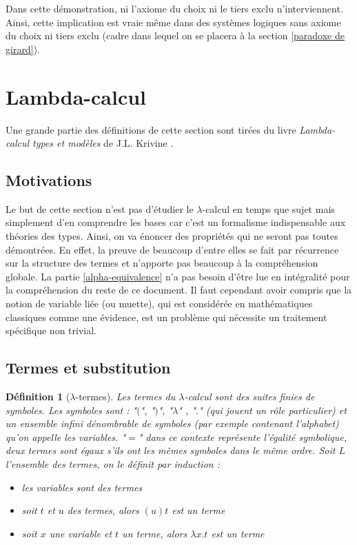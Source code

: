 \documentclass[a4paper,12pt]{article}
\theoremstyle{plain}
\newtheorem{defi}[theo]{Définition}
\begin{document}
Dans cette démonstration, ni l'axiome du choix ni le tiers exclu
n'interviennent. Ainsi, cette implication est vraie même dans des
systèmes logiques sans axiome du choix ni tiers exclu (cadre dans lequel
on se placera à la section \ref{paradoxe de girard}).

\clearpage

\section{Lambda-calcul}
\label{lambda-calcul}

Une grande partie des définitions de cette section sont tirées du livre \textit{Lambda-calcul types et modèles} de J.L. Krivine \cite{Lambda-calc}.

\subsection{Motivations}

Le but de cette section n'est pas d'étudier le $\lambda$-calcul en temps que sujet mais simplement d'en comprendre les bases car c'est un formalisme indispensable aux théories des types. Ainsi, on va énoncer des propriétés qui ne seront pas toutes démontrées. En effet, la preuve de beaucoup d'entre elles se fait par récurrence sur la structure des termes et n'apporte pas beaucoup à la compréhension globale. La partie \ref{alpha-equivalence} n'a pas besoin d'être lue en intégralité pour la compréhension du reste de ce document. Il faut cependant avoir compris que la notion de variable liée (ou muette), qui est considérée en mathématiques classiques comme une évidence, est un problème qui nécessite un traitement spécifique non trivial.

\subsection{Termes et substitution}
\label{termes et substitution}

\begin{defi}[$\lambda$-termes]
Les termes du $\lambda$-calcul sont des suites finies de symboles. Les symboles sont : "$($", "$)$",  "$\lambda$" , "." (qui jouent un rôle particulier) et un ensemble infini dénombrable de symboles (par exemple contenant l'alphabet) qu'on appelle les variables. "$=$" dans ce contexte représente l'égalité symbolique, deux termes sont égaux s'ils ont les mêmes symboles dans le même ordre. Soit $L$ l'ensemble des termes, on le définit par induction :

\begin{itemize}
\setlength\itemsep{ -1.5 em}
\item les variables sont des termes\\
\item soit $t$ et $u$ des termes, alors $( u ) t $ est un terme\\
\item soit $x$ une variable et $t$ un terme, alors $\lambda x . t$ est un terme 
\end{itemize}
\label{lambda-terme}
\end{defi}
\end{document}
